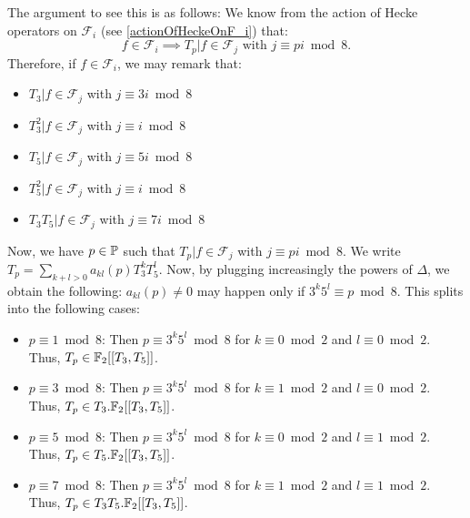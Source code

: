 The argument to see this is as follows:
We know from the action of Hecke operators on $\mathcal{F}_i$ (see \ref{actionOfHeckeOnF_i}) that:
$$
f \in \mathcal{F}_i \implies T_p|f \in \mathcal{F}_j \text{ with } j \equiv pi \bmod 8.
$$
Therefore, if $f \in \mathcal{F}_i$, we may remark that:
\begin{itemize}
	\item $T_3|f \in \mathcal{F}_j$ with $j \equiv 3i \bmod 8$
	\item $T_3^2|f \in \mathcal{F}_j$ with $j \equiv i \bmod 8$
	\item $T_5|f \in \mathcal{F}_j$ with $j \equiv 5i \bmod 8$
	\item $T_5^2|f \in \mathcal{F}_j$ with $j \equiv i \bmod 8$
	\item $T_3T_5|f \in \mathcal{F}_j$ with $j \equiv 7i \bmod 8$
\end{itemize}

Now, we have $p \in \mathbb{P}$ such that $T_p|f \in \mathcal{F}_j$ with $j \equiv pi \bmod 8$.
We write $T_p = \sum_{k+l>0} a_{kl}(p) T_3^kT_5^l$.
Now, by plugging increasingly the powers of $\Delta$, we obtain the following:
$a_{kl}(p) \neq 0$ may happen only if $3^k5^l \equiv p \bmod 8$.
This splits into the following cases:
\begin{itemize}
	\item $p \equiv 1 \bmod 8$: Then $p \equiv 3^k5^l \bmod 8$ for $k \equiv 0 \bmod 2$ and $l \equiv 0 \bmod 2$.
	Thus,  $T_p \in \mathbb{F}_2[[T_3,T_5]]$.
	
	\item $p \equiv 3 \bmod 8$: Then $p \equiv 3^k5^l \bmod 8$ for $k \equiv 1 \bmod 2$ and $l \equiv 0 \bmod 2$.
	Thus,  $T_p \in T_3.\mathbb{F}_2[[T_3,T_5]]$.
	
	\item $p \equiv 5 \bmod 8$: Then $p \equiv 3^k5^l \bmod 8$ for $k \equiv 0 \bmod 2$ and $l \equiv 1 \bmod 2$.
	Thus,  $T_p \in T_5.\mathbb{F}_2[[T_3,T_5]]$.
	
	\item $p \equiv 7 \bmod 8$: Then $p \equiv 3^k5^l \bmod 8$ for $k \equiv 1 \bmod 2$ and $l \equiv 1 \bmod 2$.
	Thus,  $T_p \in T_3T_5.\mathbb{F}_2[[T_3,T_5]]$.
\end{itemize}

